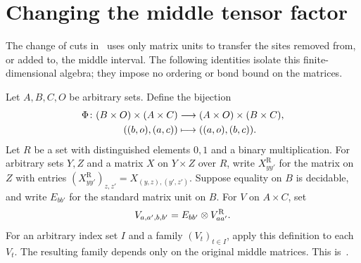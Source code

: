 \section{Changing the middle tensor factor}

The change of cuts in~\cite[Proposition~5.7]{Arad2016RigorousRG}
uses only matrix units to transfer the sites removed from, or added to, the
middle interval. The following identities isolate this finite-dimensional
algebra; they impose no ordering or bond bound on the matrices.

\begin{definition}
    \label{def:chain_middle_factor_exchange}
    \leanok
    Let $A,B,C,O$ be arbitrary sets. Define the bijection
    \begin{align}
        \Phi\colon (B\times O)\times(A\times C)
                      & \longrightarrow(A\times O)\times(B\times C),\notag \\
        ((b,o),(a,c)) & \longmapsto((a,o),(b,c)).\notag
    \end{align}
    Let $R$ be a set with distinguished elements $0,1$ and a binary
    multiplication. For arbitrary sets $Y,Z$ and a matrix $X$ on $Y\times Z$
    over $R$, write $X^{\mathrm R}_{yy'}$ for the matrix on $Z$ with entries
    $(X^{\mathrm R}_{yy'})_{z,z'}=X_{(y,z),(y',z')}$.
    Suppose equality on $B$ is decidable, and write $E_{bb'}$ for the
    standard matrix unit on $B$. For $V$ on $A\times C$, set
    \begin{align}
        V_{a,a',b,b'}=E_{bb'}\otimes V^{\mathrm R}_{aa'}.\notag
    \end{align}
    For an arbitrary index set $I$ and a family $(V_t)_{t\in I}$, apply
    this definition to each $V_t$.
    The resulting family depends only on the original middle matrices.
    This is~\cite[``Exchange of the middle coordinates'']{QICLean2026Blueprint}.
\end{definition}

